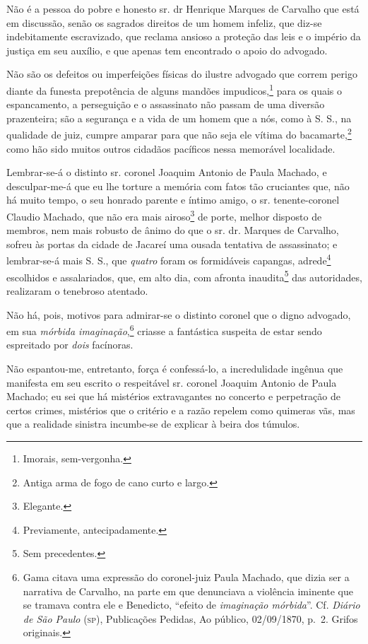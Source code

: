 {Não é a pessoa do pobre e honesto sr. dr Henrique Marques de Carvalho
que está em discussão, senão os sagrados direitos de um homem infeliz,
que diz-se indebitamente escravizado, que reclama ansioso a proteção das
leis e o império da justiça em seu auxílio, e que apenas tem encontrado
o apoio do advogado.

Não são os defeitos ou imperfeições físicas do ilustre advogado que
correm perigo diante da funesta prepotência de alguns mandões
impudicos,\footnote{ Imorais, sem-vergonha.} para os quais o
espancamento, a perseguição e o assassinato não passam de uma diversão
prazenteira; são a segurança e a vida de um homem que a nós, como à S.
S., na qualidade de juiz, cumpre amparar para que não seja ele vítima do
bacamarte,\footnote{ Antiga arma de fogo de cano curto e largo.} como
hão sido muitos outros cidadãos pacíficos nessa memorável localidade.

Lembrar-se-á o distinto sr. coronel Joaquim Antonio de Paula Machado, e
desculpar-me-á que eu lhe torture a memória com fatos tão cruciantes
que, não há muito tempo, o seu honrado parente e íntimo amigo, o sr.
tenente-coronel Claudio Machado, que não era mais airoso\footnote{
  Elegante.} de porte, melhor disposto de membros, nem mais robusto de
ânimo do que o sr. dr. Marques de Carvalho, sofreu às portas da cidade
de Jacareí uma ousada tentativa de assassinato; e lembrar-se-á mais S.
S., que \emph{quatro} foram os formidáveis capangas, adrede\footnote{
  Previamente, antecipadamente.} escolhidos e assalariados, que, em alto
dia, com afronta inaudita\footnote{ Sem precedentes.} das autoridades,
realizaram o tenebroso atentado.

Não há, pois, motivos para admirar-se o distinto coronel que o digno
advogado, em sua \emph{mórbida imaginação},\footnote{ Gama citava uma
  expressão do coronel-juiz Paula Machado, que dizia ser a narrativa de
  Carvalho, na parte em que denunciava a violência iminente que se
  tramava contra ele e Benedicto, ``efeito de \emph{imaginação mórbida}''.
  Cf. \emph{Diário de São Paulo} (\textsc{sp}), Publicações Pedidas, Ao público,
  02/09/1870, p.~2. Grifos originais.} criasse a fantástica suspeita de
estar sendo espreitado por \emph{dois} facínoras.

Não espantou-me, entretanto, força é confessá-lo, a incredulidade
ingênua que manifesta em seu escrito o respeitável sr. coronel Joaquim
Antonio de Paula Machado; eu sei que há mistérios extravagantes no
concerto e perpetração de certos crimes, mistérios que o critério e a
razão repelem como quimeras vãs, mas que a realidade sinistra incumbe-se
de explicar à beira dos túmulos.

}
